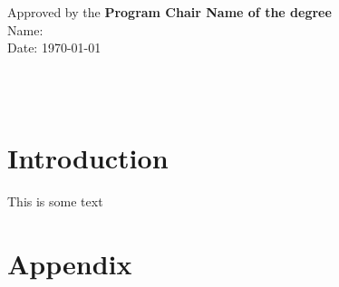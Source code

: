 \documentclass{capstone-project}
\newcommand{\degreename}{Name of the degree}
\begin{document}
\vspace*{0.3in}
\begin{flushleft}
    Approved by the \textbf{Program Chair \degreename} \\
    Name:                                              \\
    Date: \today                                       \\
\end{flushleft}

\clearpage

\\
\\
\tableofcontents
\listoftables
\listoffigures
\chapter{Introduction}
This is some text \cite{einstein}


\appendix
\chapter{Appendix}
\end{document}
